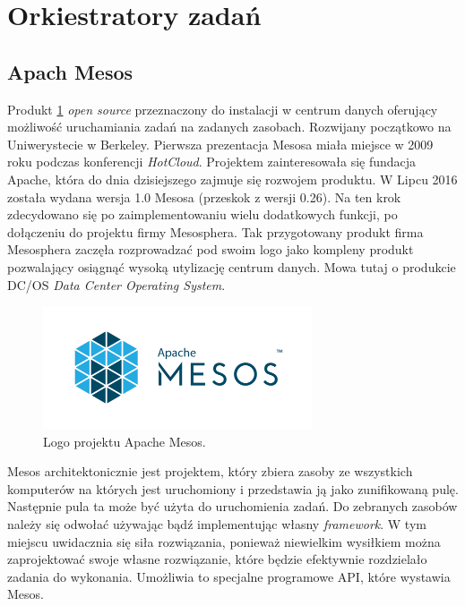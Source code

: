 \documentclass[10pt,a4paper,titlepage,twoside]{report}
\begin{document}
\newpage

\section{Orkiestratory zadań}

\subsection{Apach Mesos}

Produkt \ref{mesos_logo} \textit{open source} przeznaczony do instalacji w centrum danych oferujący możliwość uruchamiania zadań na zadanych zasobach. Rozwijany początkowo na Uniwerystecie w Berkeley. Pierwsza prezentacja Mesosa miała miejsce w 2009 roku podczas konferencji \textit{HotCloud}. Projektem zainteresowała się fundacja Apache, która do dnia dzisiejszego zajmuje się rozwojem produktu. W Lipcu 2016 została wydana wersja 1.0 Mesosa (przeskok z wersji 0.26). Na ten krok zdecydowano się po zaimplementowaniu wielu dodatkowych funkcji, po dołączeniu do projektu firmy Mesosphera. Tak przygotowany produkt firma Mesosphera zaczęła rozprowadzać pod swoim logo jako kompleny produkt pozwalający osiągnąć wysoką utylizację centrum danych. Mowa tutaj o produkcie DC/OS \textit{Data Center Operating System}. 

\begin{figure}[!h]
	\centering
	\includegraphics[scale=1]{pics/apache_mesos_logo.png}
	\caption{Logo projektu Apache Mesos.}
	\label{mesos_logo}
\end{figure}

Mesos architektonicznie jest projektem, który zbiera zasoby ze wszystkich komputerów na których jest uruchomiony i przedstawia ją jako zunifikowaną pulę. Następnie pula ta może być użyta do uruchomienia zadań. Do zebranych zasobów należy się odwołać używając bądź implementując własny \textit{framework}. W tym miejscu uwidacznia się siła rozwiązania, ponieważ niewielkim wysiłkiem można zaprojektować swoje własne rozwiązanie, które będzie efektywnie rozdzielało zadania do wykonania. Umożliwia to specjalne programowe API, które wystawia Mesos.
\end{document}
